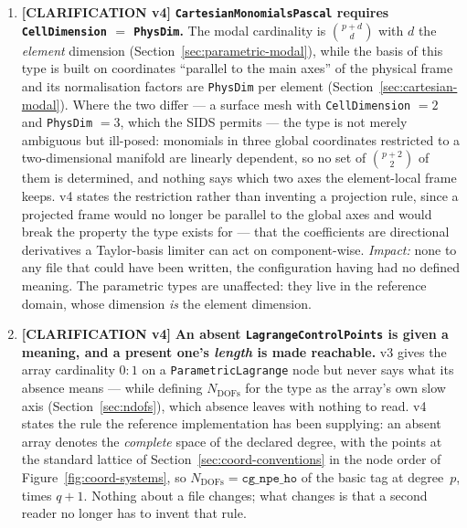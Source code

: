 \documentclass[11pt,letterpaper]{article}
\newif\ifvfourdraft
\newenvironment{v4block}{\ifvfourdraft\color{v4violet}\fi\ignorespaces}{\par}
\newcommand{\CLARIFYIV}{\ifvfourdraft
  \textcolor{v4violet}{\textbf{[CLARIFICATION v4]}}\else
  \textcolor{clarifybrown}{\textbf{[CLARIFICATION v4]}}\fi}
\begin{document}
{\begin{v4block}
\begin{enumerate}[leftmargin=1.4em,itemsep=0.5em]
  \item \CLARIFYIV{} \textbf{\texttt{CartesianMonomialsPascal} requires
    \texttt{CellDimension} $=$ \texttt{PhysDim}.}  The modal cardinality is
    $\binom{p+d}{d}$ with $d$ the \emph{element} dimension
    (Section~\ref{sec:parametric-modal}), while the basis of this type is built on
    coordinates ``parallel to the main axes'' of the physical frame and its
    normalisation factors are \texttt{PhysDim} per element
    (Section~\ref{sec:cartesian-modal}).  Where the two differ --- a surface mesh
    with \texttt{CellDimension} $=2$ and \texttt{PhysDim} $=3$, which the SIDS
    permits --- the type is not merely ambiguous but ill-posed: monomials in three
    global coordinates restricted to a two-dimensional manifold are linearly
    dependent, so no set of $\binom{p+2}{2}$ of them is determined, and nothing
    says which two axes the element-local frame keeps.  v4 states the restriction
    rather than inventing a projection rule, since a projected frame would no
    longer be parallel to the global axes and would break the property the type
    exists for --- that the coefficients are directional derivatives a
    Taylor-basis limiter can act on component-wise.
    \textit{Impact:} none to any file that could have been written, the
    configuration having had no defined meaning.  The parametric types are
    unaffected: they live in the reference domain, whose dimension \emph{is} the
    element dimension.

  \item \CLARIFYIV{} \textbf{An absent \texttt{LagrangeControlPoints} is given a
    meaning, and a present one's \emph{length} is made reachable.}  v3 gives the
    array cardinality $0{:}1$ on a \texttt{ParametricLagrange} node but never says
    what its absence means --- while defining $N_\mathrm{DOFs}$ for the type as
    the array's own slow axis (Section~\ref{sec:ndofs}), which absence leaves with
    nothing to read.  v4 states the rule the reference implementation has been
    supplying: an absent array denotes the \emph{complete} space of the declared
    degree, with the points at the standard lattice of
    Section~\ref{sec:coord-conventions} in the node order of
    Figure~\ref{fig:coord-systems}, so $N_\mathrm{DOFs} = \texttt{cg\_npe\_ho}$ of
    the basic tag at degree~$p$, times $q+1$.  Nothing about a file changes; what
    changes is that a second reader no longer has to invent that rule.


\end{enumerate}
\end{v4block}}
\end{document}
